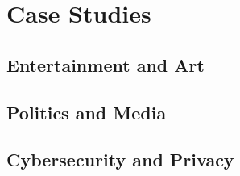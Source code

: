 
\chapter{Case Studies}\label{chapter:applications}

\section{Entertainment and Art}\label{chapter:art}
\section{Politics and Media}\label{chapter:media}
\section{Cybersecurity and Privacy}\label{chapter:cybersecurity}